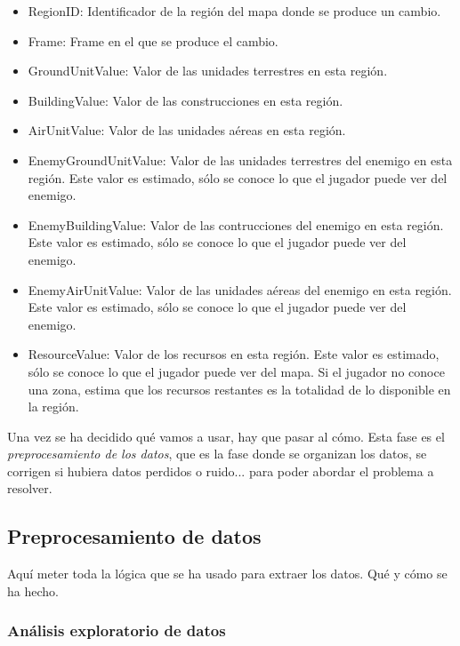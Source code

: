 \documentclass[a4paper,11pt]{book}\usepackage[]{graphicx}\usepackage[]{color}
\theoremstyle{plain}
\theoremstyle{definition}
\begin{document}
\begin{itemize}
\begin{itemize}
    \item RegionID: Identificador de la región del mapa donde se produce un cambio.
    \item Frame: Frame en el que se produce el cambio.
    \item GroundUnitValue: Valor de las unidades terrestres en esta región.
    \item BuildingValue: Valor de las construcciones en esta región.
    \item AirUnitValue: Valor de las unidades aéreas en esta región.
    \item EnemyGroundUnitValue: Valor de las unidades terrestres del enemigo en esta región.
    Este valor es estimado, sólo se conoce lo que el jugador puede ver del enemigo.
    \item EnemyBuildingValue: Valor de las contrucciones del enemigo en esta región.
    Este valor es estimado, sólo se conoce lo que el jugador puede ver del enemigo.
    \item EnemyAirUnitValue: Valor de las unidades aéreas del enemigo en esta región.
    Este valor es estimado, sólo se conoce lo que el jugador puede ver del enemigo.
    \item ResourceValue: Valor de los recursos en esta región. Este valor es estimado,
    sólo se conoce lo que el jugador puede ver del mapa. Si el jugador no conoce una zona, estima que los recursos restantes es la totalidad de lo disponible en la región.
  \end{itemize}
\end{itemize}

Una vez se ha decidido qué vamos a usar, hay que pasar al cómo. Esta fase es el \emph{preprocesamiento de los datos}, que es la fase donde se organizan los datos, se corrigen si hubiera datos perdidos o ruido... para poder abordar el problema a resolver.

\subsection{Preprocesamiento de datos}
\label{subsec:preprocesamiento}

Aquí meter toda la lógica que se ha usado para extraer los datos. Qué y cómo se ha hecho.

\subsubsection{Análisis exploratorio de datos}
\label{subsubsec:exploratorio}
\end{document}

